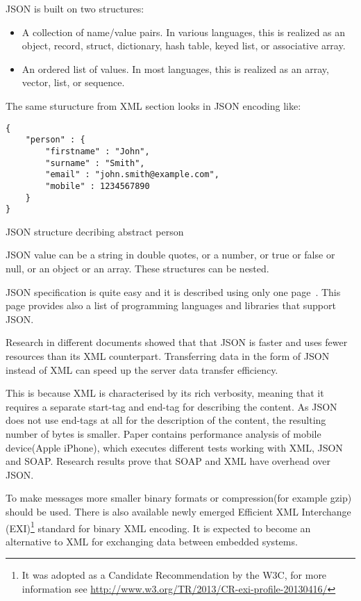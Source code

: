 JSON is built on two structures\cite{json_org}:
\begin{itemize}
  \item A collection of name/value pairs. In various languages, this is realized
  as an object, record, struct, dictionary, hash table, keyed list, or associative array.
  \item An ordered list of values. In most languages, this is realized as an
  array, vector, list, or sequence.
\end{itemize}

The same sturucture from XML section looks in JSON encoding like:
\begin{listing}[H]
\begin{verbatim}
{
	"person" : {
		"firstname" : "John",
		"surname" : "Smith",
		"email" : "john.smith@example.com",
		"mobile" : 1234567890
	}
}
\end{verbatim}
\caption{JSON structure decribing abstract person}
\label{lst:json_person_example}
\end{listing}

JSON value can be a string in double quotes, or a number, or true or false or
null, or an object or an array. These structures can be nested.

JSON specification is quite easy and it is  described using only one
page~\cite{json_org}. This page provides also a list of programming languages
and libraries that support JSON. 

Research in different documents \cite{5931189,NurseitovPRI09} showed that
that JSON is faster and uses fewer resources than its XML
counterpart.
Transferring data in the form of JSON instead of XML can speed up the server
data transfer efficiency.

This is because XML is characterised by its rich verbosity,
meaning that it requires a separate start-tag and end-tag for describing the content.
As JSON does not use end-tags at all for the description of the content, the
resulting number of bytes is smaller.
Paper \cite{5931189} contains performance analysis of mobile device(Apple
iPhone), which executes different tests working with XML, JSON and SOAP.
Research results prove that SOAP and XML have overhead over JSON.

To make messages more smaller binary formats or compression(for example gzip)  
should be used. There is also available newly emerged Efficient XML Interchange
(EXI)\footnote{It was adopted as a Candidate Recommendation by the
W3C, for more information see
\url{http://www.w3.org/TR/2013/CR-exi-profile-20130416/}} standard for binary XML encoding. It is expected to become an alternative to XML for exchanging data between embedded systems\cite{6120046}.

